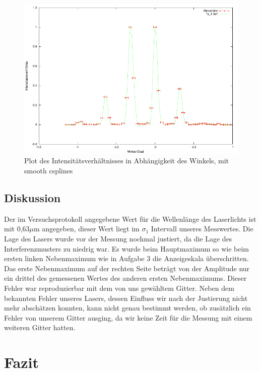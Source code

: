 \documentclass[12pt]{scrartcl}
\begin{document}
\begin{figure}[H]
\centering
    \includegraphics[scale = 1]{a_4.pdf}
  	\caption[Plot des Intensitätsverhältnisses in Abhängigkeit des Winkels, mit smooth csplines]{Plot des Intensitätsverhältnisses in Abhängigkeit des Winkels, mit smooth csplines}
  \label{fig:a_4}
\end{figure}


\subsection{Diskussion}
Der im Versuchsprotokoll angegebene Wert für die Wellenlänge des Laserlichts ist mit 0,63$\mu$m angegeben, dieser Wert liegt im $\sigma_1$ Intervall unseres Messwertes. Die Lage des Lasers wurde vor der Messung nochmal justiert, da die Lage des Interferenzmusters zu niedrig war. Es wurde beim Hauptmaximum so wie beim ersten linken Nebenmaximum wie in Aufgabe 3 die Anzeigeskala überschritten. Das erste Nebenmaximum auf der rechten Seite beträgt von der Amplitude nur ein drittel des gemessenen Wertes des anderen ersten Nebenmaximums. Dieser Fehler war reproduzierbar mit dem von uns gewähltem Gitter. Neben dem bekannten Fehler unseres Lasers, dessen Einfluss wir nach der Justierung nicht mehr abschätzen konnten, kann nicht genau bestimmt werden, ob zusätzlich ein Fehler von unserem Gitter ausging, da wir keine Zeit für die Messung mit einem weiteren Gitter hatten.

\section{Fazit}
\end{document}
